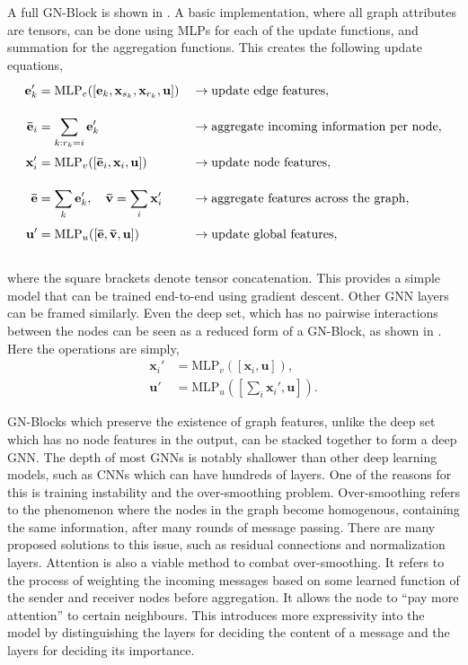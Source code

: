 A full GN-Block is shown in .
A basic implementation, where all graph attributes are tensors, can be done using MLPs for each of the update functions, and summation for the aggregation functions.
This creates the following update equations,
\newcommand{\tall}{\vphantom{\sum_{k: r_k = i}}}
\begin{equation} \label{eq:gn_update}
    \begin{aligned}
        \tall \mathbf{e}_k' &= \text{MLP}_e([\mathbf{e}_k, \mathbf{x}_{s_k}, \mathbf{x}_{r_k}, \mathbf{u}]) &&\rightarrow \text{update edge features}, \\
        \tall \mathbf{\bar{e}}_i &= \sum_{k: r_k = i} \mathbf{e}_k' &&\rightarrow \text{aggregate incoming information per node}, \\
        \tall \mathbf{x}_i' &= \text{MLP}_v([\mathbf{\bar{e}}_i, \mathbf{x}_i, \mathbf{u}]) &&\rightarrow \text{update node features}, \\
        \tall \mathbf{\bar{e}} &= \sum_{k} \mathbf{e}_k', \quad \mathbf{\bar{v}} = \sum_{i} \mathbf{x}_i' &&\rightarrow \text{aggregate features across the graph}, \\
        \tall \mathbf{u}' &= \text{MLP}_u([\mathbf{\bar{e}}, \mathbf{\bar{v}}, \mathbf{u}]) &&\rightarrow \text{update global features},
    \end{aligned}
\end{equation}

where the square brackets denote tensor concatenation.
This provides a simple model that can be trained end-to-end using gradient descent.
Other GNN layers can be framed similarly.
Even the deep set, which has no pairwise interactions between the nodes can be seen as a reduced form of a GN-Block, as shown in .
Here the operations are simply,
\begin{align}
    \mathbf{x}_i' &= \text{MLP}_v\left(\left[\mathbf{x}_i, \mathbf{u}\right]\right),\\
    \mathbf{u}' &= \text{MLP}_u\left(\left[\sum_{i} \mathbf{x}_i', \mathbf{u}\right]\right).
\end{align}

GN-Blocks which preserve the existence of graph features, unlike the deep set which has no node features in the output, can be stacked together to form a deep GNN.
The depth of most GNNs is notably shallower than other deep learning models, such as CNNs which can have hundreds of layers.
One of the reasons for this is training instability and the over-smoothing problem.
Over-smoothing refers to the phenomenon where the nodes in the graph become homogenous, containing the same information, after many rounds of message passing.
There are many proposed solutions to this issue, such as residual connections and normalization layers.
Attention is also a viable method to combat over-smoothing.
It refers to the process of weighting the incoming messages based on some learned function of the sender and receiver nodes before aggregation.
It allows the node to ``pay more attention'' to certain neighbours.
This introduces more expressivity into the model by distinguishing the layers for deciding the content of a message and the layers for deciding its importance.

